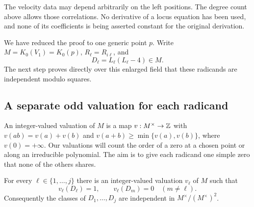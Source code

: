 The velocity data may depend arbitrarily on the left positions. The
degree count above allows those correlations. No derivative of a locus
equation has been used, and none of its coefficients is being asserted
constant for the original derivation.

We have reduced the proof to one generic point \(p\). Write
\(M=K_0(V_1)=K_0(p)\), \(R_\ell=R_{i\ell}\), and
\[
 D_\ell=L_\ell(L_\ell-4)\in M.
\]
The next step proves directly over this enlarged field that these
radicands are independent modulo squares.

\subsection{A separate odd valuation for each radicand}

An integer-valued valuation of \(M\) is a map
\(v:M^\times\to\mathbb Z\) with \(v(ab)=v(a)+v(b)\) and
\(v(a+b)\ge\min\{v(a),v(b)\}\), where \(v(0)=+\infty\).
Our valuations will count the order of a zero at a chosen point or
along an irreducible polynomial. The aim is to give each radicand
one simple zero that none of the others shares.

\begin{lemma}\label{alg:private-valuations}
For every \(\ell\in\{1,\ldots,j\}\) there is an integer-valued
valuation \(v_\ell\) of \(M\) such that
\[
 v_\ell(D_\ell)=1,\qquad v_\ell(D_m)=0\quad(m\ne\ell).
\]
Consequently the classes of \(D_1,\ldots,D_j\) are independent in
\(M^\times/(M^\times)^2\).
\end{lemma}

